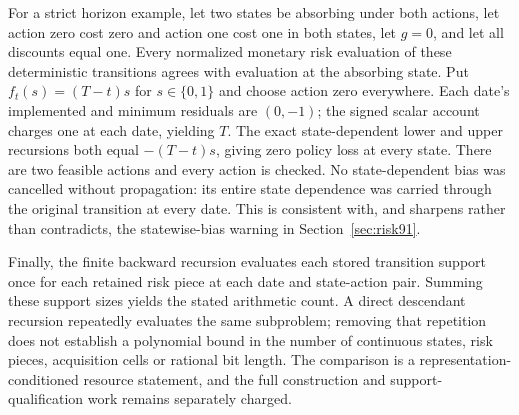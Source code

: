 For a strict horizon example, let two states be absorbing under both actions, let action zero cost zero and action one cost one in both states, let $g=0$, and let all discounts equal one. Every normalized monetary risk evaluation of these deterministic transitions agrees with evaluation at the absorbing state. Put $f_t(s)=(T-t)s$ for $s\in\{0,1\}$ and choose action zero everywhere. Each date's implemented and minimum residuals are $(0,-1)$; the signed scalar account charges one at each date, yielding $T$. The exact state-dependent lower and upper recursions both equal $-(T-t)s$, giving zero policy loss at every state. There are two feasible actions and every action is checked. No state-dependent bias was cancelled without propagation: its entire state dependence was carried through the original transition at every date. This is consistent with, and sharpens rather than contradicts, the statewise-bias warning in Section~\ref{sec:risk91}.

Finally, the finite backward recursion evaluates each stored transition support once for each retained risk piece at each date and state-action pair. Summing these support sizes yields the stated arithmetic count. A direct descendant recursion repeatedly evaluates the same subproblem; removing that repetition does not establish a polynomial bound in the number of continuous states, risk pieces, acquisition cells or rational bit length. The comparison is a representation-conditioned resource statement, and the full construction and support-qualification work remains separately charged.
